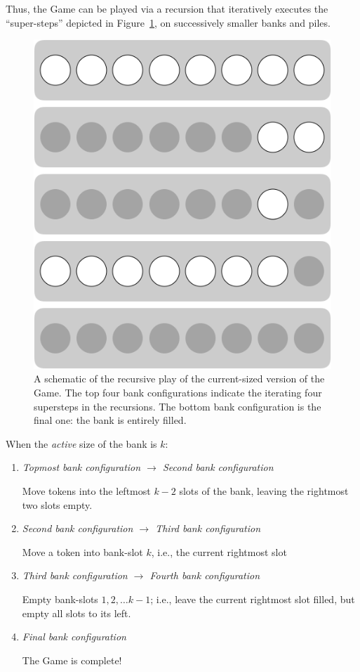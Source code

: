 Thus, the Game can be played via a recursion that iteratively executes
the ``super-steps'' depicted in Figure~\ref{fig:jeujetonsPrinciple},
on successively smaller banks and piles.
\begin{figure}[htb]
\begin{center}
        \includegraphics[scale=0.3]{FiguresMaths/GameTokenPrinciple.png}
\caption{A schematic of the recursive play of the current-sized
  version of the Game.  The top four bank configurations indicate the
  iterating four supersteps in the recursions.  The bottom bank
  configuration is the final one: the bank is entirely filled. }
        \label{fig:jeujetonsPrinciple}
\end{center}
\end{figure}
When the {\em active} size of the bank is $k$:
\begin{enumerate}
\item
{\it Topmost bank configuration $\longrightarrow$ Second bank
  configuration}

Move tokens into the leftmost $k-2$ slots of the bank, leaving the
rightmost two slots empty.

\item
{\it Second bank configuration $\longrightarrow$ Third bank configuration}

Move a token into bank-slot $k$, i.e., the current rightmost slot

\item
{\it Third bank configuration $\longrightarrow$ Fourth bank configuration}

Empty  bank-slots $1, 2, \ldots k-1$; i.e., leave the current
rightmost slot filled, but empty all slots to its left.

\item
{\it Final bank configuration}

The Game is complete!
\end{enumerate}

